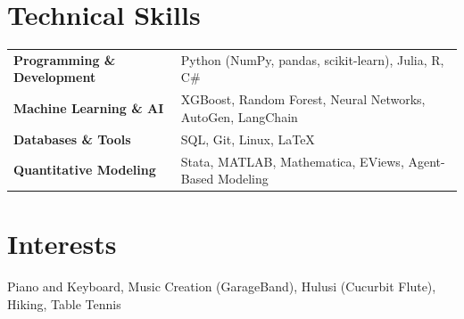 \documentclass[a4paper,12pt]{article}
\begin{document}
\section{Technical Skills}
\begin{tabularx}{\linewidth}{@{}l X@{}}
\textbf{Programming \& Development}  &  \hfill \normalsize{Python (NumPy, pandas, scikit-learn), Julia, R, C\#}\\ 
\textbf{Machine Learning \& AI}  & \hfill \normalsize{XGBoost, Random Forest, Neural Networks, AutoGen, LangChain}\\ 
\textbf{Databases \& Tools}  & \hfill \normalsize{SQL, Git, Linux, \LaTeX}\\ 
\textbf{Quantitative Modeling}  & \hfill \normalsize{Stata, MATLAB, Mathematica, EViews, Agent-Based Modeling}
\end{tabularx} %




\section{Interests}

Piano and Keyboard, Music Creation (GarageBand), Hulusi (Cucurbit Flute), Hiking, Table Tennis




\end{document}
